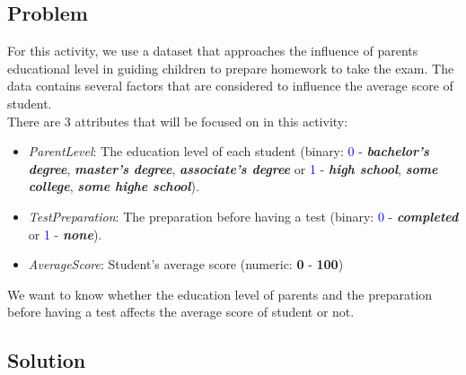 \documentclass[a4paper]{article}
\begin{document}
\subsection{Problem} 
\vspace{0.4cm}
For this activity, we use a dataset that approaches the influence of parents educational level in guiding children to prepare homework to take the exam. The data contains several factors that are considered to influence the average score of student.\\ \newline
There are 3 attributes that will be focused on in this activity:
\begin{itemize}
    \item \textit{ParentLevel}: The education level of each student (binary: \textcolor{blue}{0} - \textbf{\textit{bachelor's degree}}, \textbf{\textit{master's degree}}, \textbf{\textit{associate's degree}} or \textcolor{blue}{1} - \textbf{\textit{high school}}, \textbf{\textit{some college}}, \textbf{\textit{some highe school}}). 
    \item \textit{TestPreparation}: The preparation before having a test (binary: \textcolor{blue}{0} - \textbf{\textit{completed}} or \textcolor{blue}{1} - \textbf{\textit{none}}).
    \item \textit{AverageScore}: Student's average score (numeric: \textbf{0} - \textbf{100})
\end{itemize}
We want to know whether the education level of parents and the preparation before having a test affects the average score of student or not.
\subsection{Solution} 
\vspace{0.4cm}
\end{document}
